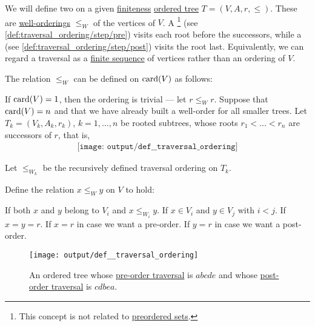 \begin{definition}\label{def:traversal_ordering}
  We will define two  on a given \hyperref[def:set_finiteness]{finiteness} \hyperref[def:ordered_tree]{ordered tree} \( T = (V, A, r, \leq) \). These are \hyperref[def:well_ordered_set]{well-orderings} \( \leq_W \) of the vertices of \( V \). A \footnote{This concept is not related to \hyperref[def:preordered_set]{preordered sets}.} (see \ref{def:traversal_ordering/step/pre}) visits each root before the successors, while a  (see \ref{def:traversal_ordering/step/post}) visits the root last. Equivalently, we can regard a traversal as a \hyperref[def:sequence]{finite sequence} of vertices rather than an ordering of \( V \).

  The relation \( \leq_W \) can be defined on \( \operatorname{card}(V) \) as follows:
  \begin{thmenum}
     If \( \operatorname{card}(V) = 1 \), then the ordering is trivial --- let \( r \leq_W r \).
     Suppose that \( \operatorname{card}(V) = n \) and that we have already built a well-order for all smaller trees. Let \( T_k = (V_k, A_k, r_k) \), \( k = 1, \ldots, n \) be rooted subtrees, whose roots \( r_1 < \ldots < r_n \) are successors of \( r \), that is,
    \begin{equation*}
      \begin{aligned}
        \texttt{[image: output/def\_\_traversal\_ordering]}
      \end{aligned}
    \end{equation*}

    Let \( \leq_{W_k} \) be the recursively defined traversal ordering on \( T_k \).

    Define the relation \( x \leq_W y \) on \( V \) to hold:
    \begin{thmenum}
       If both \( x \) and \( y \) belong to \( V_i \) and \( x \leq_{W_i} y \).
       If \( x \in V_i \) and \( y \in V_j \) with \( i < j \).
       If \( x = y = r \).
       If \( x = r \) in case we want a pre-order.
       If \( y = r \) in case we want a post-order.
    \end{thmenum}
  \end{thmenum}

  \begin{figure}[!ht]
    \centering
    \texttt{[image: output/def\_\_traversal\_ordering]}
    \caption{An ordered tree whose \hyperref[def:traversal_ordering]{pre-order traversal} is \( abcde \) and whose \hyperref[def:traversal_ordering]{post-order traversal} is \( cdbea \).}
    \label{fig:def:traversal_ordering}
  \end{figure}
\end{definition}
